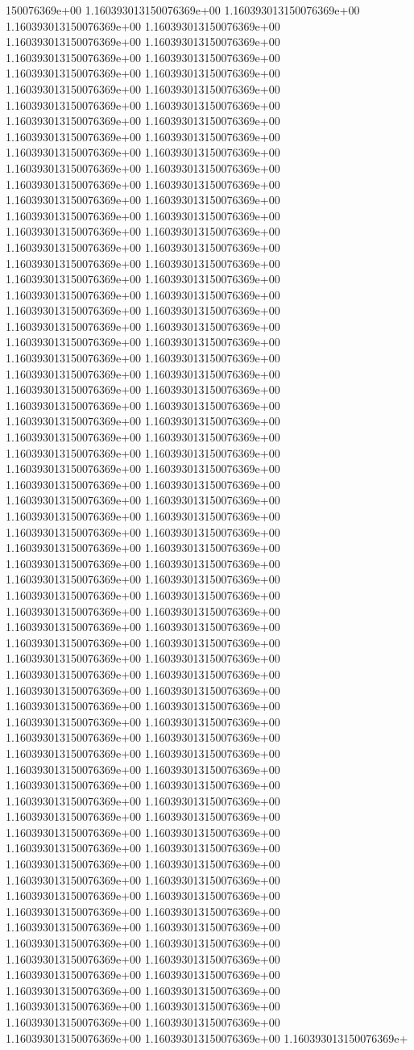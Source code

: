 150076369e+00	1.160393013150076369e+00	1.160393013150076369e+00	1.160393013150076369e+00	1.160393013150076369e+00	1.160393013150076369e+00	1.160393013150076369e+00	1.160393013150076369e+00	1.160393013150076369e+00	1.160393013150076369e+00	1.160393013150076369e+00	1.160393013150076369e+00	1.160393013150076369e+00	1.160393013150076369e+00	1.160393013150076369e+00	1.160393013150076369e+00	1.160393013150076369e+00	1.160393013150076369e+00	1.160393013150076369e+00	1.160393013150076369e+00	1.160393013150076369e+00	1.160393013150076369e+00	1.160393013150076369e+00	1.160393013150076369e+00	1.160393013150076369e+00	1.160393013150076369e+00	1.160393013150076369e+00	1.160393013150076369e+00	1.160393013150076369e+00	1.160393013150076369e+00	1.160393013150076369e+00	1.160393013150076369e+00	1.160393013150076369e+00	1.160393013150076369e+00	1.160393013150076369e+00	1.160393013150076369e+00	1.160393013150076369e+00	1.160393013150076369e+00	1.160393013150076369e+00	1.160393013150076369e+00	1.160393013150076369e+00	1.160393013150076369e+00	1.160393013150076369e+00	1.160393013150076369e+00	1.160393013150076369e+00	1.160393013150076369e+00	1.160393013150076369e+00	1.160393013150076369e+00	1.160393013150076369e+00	1.160393013150076369e+00	1.160393013150076369e+00	1.160393013150076369e+00	1.160393013150076369e+00	1.160393013150076369e+00	1.160393013150076369e+00	1.160393013150076369e+00	1.160393013150076369e+00	1.160393013150076369e+00	1.160393013150076369e+00	1.160393013150076369e+00	1.160393013150076369e+00	1.160393013150076369e+00	1.160393013150076369e+00	1.160393013150076369e+00	1.160393013150076369e+00	1.160393013150076369e+00	1.160393013150076369e+00	1.160393013150076369e+00	1.160393013150076369e+00	1.160393013150076369e+00	1.160393013150076369e+00	1.160393013150076369e+00	1.160393013150076369e+00	1.160393013150076369e+00	1.160393013150076369e+00	1.160393013150076369e+00	1.160393013150076369e+00	1.160393013150076369e+00	1.160393013150076369e+00	1.160393013150076369e+00	1.160393013150076369e+00	1.160393013150076369e+00	1.160393013150076369e+00	1.160393013150076369e+00	1.160393013150076369e+00	1.160393013150076369e+00	1.160393013150076369e+00	1.160393013150076369e+00	1.160393013150076369e+00	1.160393013150076369e+00	1.160393013150076369e+00	1.160393013150076369e+00	1.160393013150076369e+00	1.160393013150076369e+00	1.160393013150076369e+00	1.160393013150076369e+00	1.160393013150076369e+00	1.160393013150076369e+00	1.160393013150076369e+00	1.160393013150076369e+00	1.160393013150076369e+00	1.160393013150076369e+00	1.160393013150076369e+00	1.160393013150076369e+00	1.160393013150076369e+00	1.160393013150076369e+00	1.160393013150076369e+00	1.160393013150076369e+00	1.160393013150076369e+00	1.160393013150076369e+00	1.160393013150076369e+00	1.160393013150076369e+00	1.160393013150076369e+00	1.160393013150076369e+00	1.160393013150076369e+00	1.160393013150076369e+00	1.160393013150076369e+00	1.160393013150076369e+00	1.160393013150076369e+00	1.160393013150076369e+00	1.160393013150076369e+00	1.160393013150076369e+00	1.160393013150076369e+00	1.160393013150076369e+00	1.160393013150076369e+00	1.160393013150076369e+00	1.160393013150076369e+00	1.160393013150076369e+00	1.160393013150076369e+00	1.160393013150076369e+00	1.160393013150076369e+00	1.160393013150076369e+00	1.160393013150076369e+00	1.160393013150076369e+